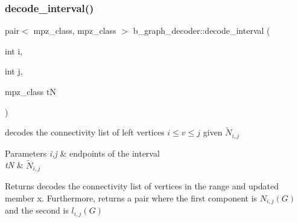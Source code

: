 \subsubsection{\texorpdfstring{decode\+\_\+interval()}{decode\_interval()}}
{\footnotesize\ttfamily pair$<$ mpz\+\_\+class, mpz\+\_\+class $>$ b\+\_\+graph\+\_\+decoder\+::decode\+\_\+interval (\begin{DoxyParamCaption}\item[{int}]{i,  }\item[{int}]{j,  }\item[{mpz\+\_\+class}]{tN }\end{DoxyParamCaption})}



decodes the connectivity list of left vertices $i \leq v \leq j$ given $\tilde{N}_{i,j}$ 


\begin{DoxyParams}{Parameters}
{\em i,j} & endpoints of the interval \\
\hline
{\em tN} & $\tilde{N}_{i,j}$ \\
\hline
\end{DoxyParams}
\begin{DoxyReturn}{Returns}
decodes the connectivity list of vertices in the range and updated member x. Furthermore, returns a pair where the first component is $N_{i,j}(G)$ and the second is $l_{i,j}(G)$ 
\end{DoxyReturn}

